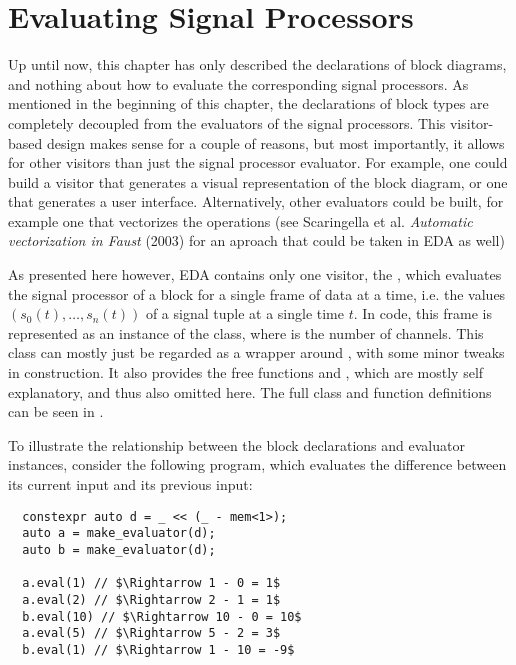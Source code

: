 \section{Evaluating Signal Processors}
\label{sec:eda_eval}

Up until now, this chapter has only described the declarations of block diagrams, and nothing about how to
evaluate the corresponding signal processors. As mentioned in the beginning of this chapter, the declarations
of block types are completely decoupled from the evaluators of the signal processors. This visitor-based
design makes sense for a couple of reasons, but most importantly, it allows for other visitors than just the
signal processor evaluator. For example, one could build a visitor that generates a visual representation of
the block diagram, or one that generates a user interface. Alternatively, other evaluators could be built,
for example one that vectorizes the operations (see Scaringella et al. \emph{Automatic vectorization in Faust} (2003)
\autocite{faust_auto_vec} for an aproach that could be taken in EDA as well)

As presented here however, EDA contains only one visitor, the , which evaluates the
signal processor of a block for a single frame of data at a time, i.e. the values $(s_0(t), \dots, s_n(t))$ of a
signal tuple at a single time $t$. In code, this frame is represented as an instance of
the  class, where
 is the number of channels. This class can mostly just be regarded as a wrapper around , with some minor tweaks in construction. It also provides the free functions
 and , which are mostly self explanatory, and
thus also omitted here. The full class and function definitions can be seen in .

To illustrate the relationship between the block declarations and evaluator instances, consider the following
program, which evaluates the difference between its current input and its previous input:

\begin{verbatim}
  constexpr auto d = _ << (_ - mem<1>);
  auto a = make_evaluator(d);
  auto b = make_evaluator(d);
  
  a.eval(1) // $\Rightarrow 1 - 0 = 1$
  a.eval(2) // $\Rightarrow 2 - 1 = 1$
  b.eval(10) // $\Rightarrow 10 - 0 = 10$
  a.eval(5) // $\Rightarrow 5 - 2 = 3$
  b.eval(1) // $\Rightarrow 1 - 10 = -9$
\end{verbatim}

